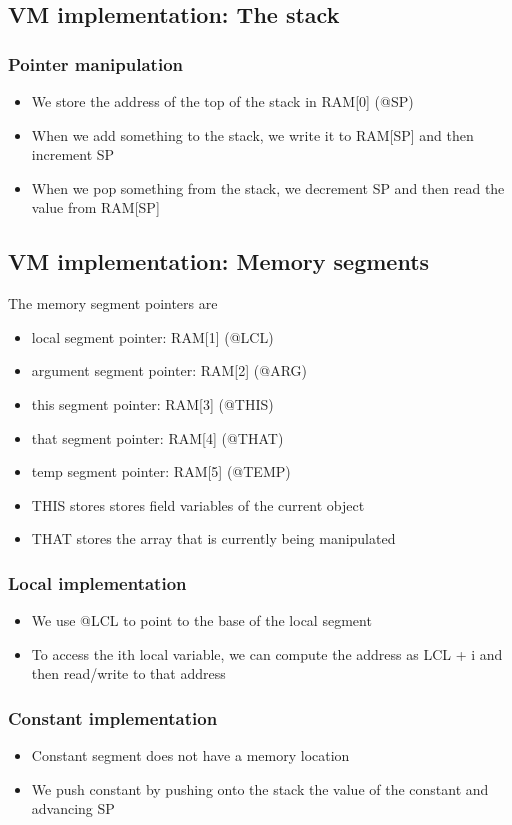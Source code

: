 \documentclass[12pt,a4paper]{article}
\begin{document}
\subsection{VM implementation: The stack}
\subsubsection{Pointer manipulation}
\begin{itemize}
    \item We store the address of the top of the stack in RAM[0] (@SP)
    \item When we add something to the stack, we write it to RAM[SP] and then increment SP
    \item When we pop something from the stack, we decrement SP and then read the value from RAM[SP]
\end{itemize}

\subsection{VM implementation: Memory segments}
The memory segment pointers are
\begin{itemize}
    \item local segment pointer: RAM[1] (@LCL)
    \item argument segment pointer: RAM[2] (@ARG)
    \item this segment pointer: RAM[3] (@THIS)
    \item that segment pointer: RAM[4] (@THAT)
    \item temp segment pointer: RAM[5] (@TEMP)
    \item THIS stores stores field variables of the current object
    \item THAT stores the array that is currently being manipulated
\end{itemize}

\subsubsection{Local implementation}
\begin{itemize}
    \item We use @LCL to point to the base of the local segment
    \item To access the ith local variable, we can compute the address as LCL + i and then read/write to that address
\end{itemize}

\subsubsection{Constant implementation}
\begin{itemize}
    \item Constant segment does not have a memory location
    \item We push constant by pushing onto the stack the value of the constant and advancing SP
\end{itemize}
\end{document}
